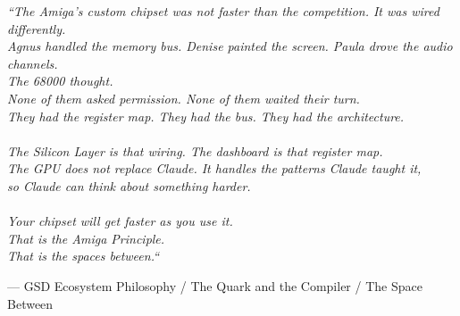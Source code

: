 \documentclass[11pt,letterpaper]{article}
\begin{document}
\begin{quotebox}
\textit{``The Amiga's custom chipset was not faster than the competition. It was wired differently.\\
Agnus handled the memory bus. Denise painted the screen. Paula drove the audio channels.\\
The 68000 thought.\\
None of them asked permission. None of them waited their turn.\\
They had the register map. They had the bus. They had the architecture.\\
\\
The Silicon Layer is that wiring. The dashboard is that register map.\\
The GPU does not replace Claude. It handles the patterns Claude taught it,\\
so Claude can think about something harder.\\
\\
Your chipset will get faster as you use it.\\
That is the Amiga Principle.\\
That is the spaces between.``}

\vspace{0.5em}
{\small\sffamily\textcolor{subtlegray}{--- GSD Ecosystem Philosophy / The Quark and the Compiler / The Space Between}}
\end{quotebox}
\end{document}
